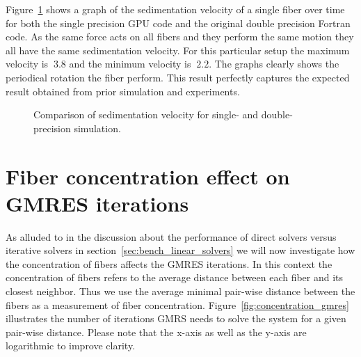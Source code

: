 Figure~\ref{fig:ring_sedimentation_velocity} shows a graph of the sedimentation velocity of a single fiber over time for both the single precision GPU code and the original double precision Fortran code. As the same force acts on all fibers and they perform the same motion they all have the same sedimentation velocity. For this particular setup the maximum velocity is $~3.8$ and the minimum velocity is $~2.2$. The graphs clearly shows the periodical rotation the fiber perform. This result perfectly captures the expected result obtained from prior simulation and experiments.

\begin{figure}[!htbp]
  \centering
  \caption{Comparison of sedimentation velocity for single- and double-precision simulation.}
  \label{fig:ring_sedimentation_velocity}
\end{figure}

\section{Fiber concentration effect on GMRES iterations}
\label{sec:example_concentration_gmres}

As alluded to in the discussion about the performance of direct solvers versus iterative solvers in section~\ref{sec:bench_linear_solvers} we will now investigate how the concentration of fibers affects the GMRES iterations. In this context the concentration of fibers refers to the average distance between each fiber and its closest neighbor. Thus we use the average minimal pair-wise distance between the fibers as a measurement of fiber concentration. Figure~\ref{fig:concentration_gmres} illustrates the number of iterations GMRS needs to solve the system for a given pair-wise distance. Please note that the x-axis as well as the y-axis are logarithmic to improve clarity.

